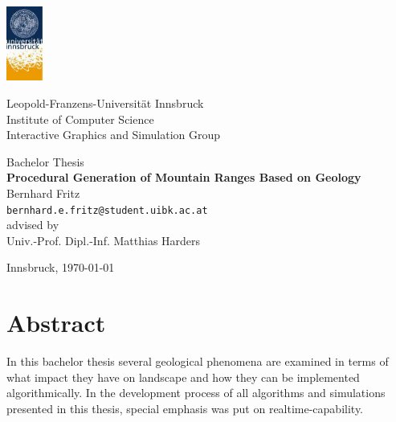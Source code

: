 \documentclass[11pt,a4paper,twoside,openright]{report}
\begin{document}

\begin{titlepage} %

\begin{center}
\includegraphics[width=1.2cm]{images/uibk}

\begin{large}
Leopold-Franzens-Universität Innsbruck\\[5mm]
Institute of Computer Science\\
Interactive Graphics and Simulation Group\\[25mm]
\end{large}

Bachelor Thesis\\[15mm]

{\LARGE \bf Procedural Generation of Mountain Ranges Based on Geology}\\[15mm]

Bernhard Fritz\\
\texttt{bernhard.e.fritz@student.uibk.ac.at}\\[35mm]

advised by\\
Univ.-Prof. Dipl.-Inf. Matthias Harders\\[10mm]

\vfill

Innsbruck, \today
\end{center}

\end{titlepage}





\chapter*{Abstract}
In this bachelor thesis several geological phenomena are examined in terms of what impact they have on landscape and how they can be implemented algorithmically. In the development process of all algorithms and simulations presented in this thesis, special emphasis was put on realtime-capability.
\end{document}
